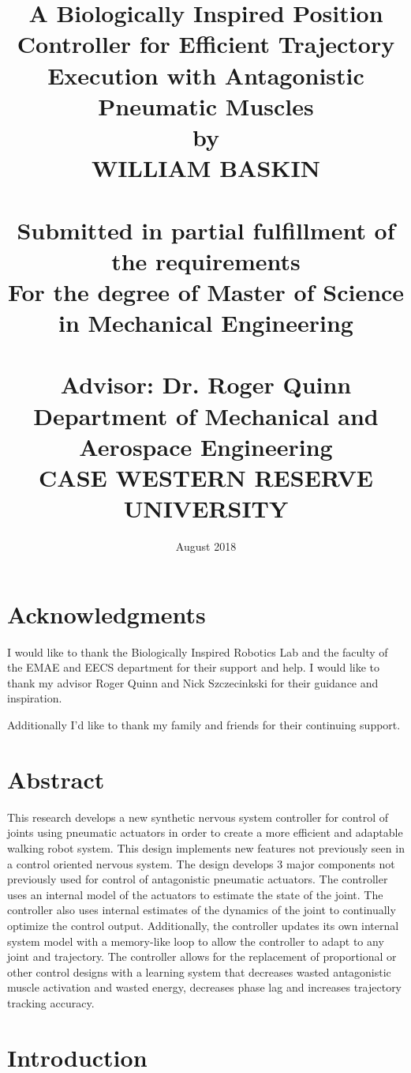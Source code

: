 \documentclass[12pt, letterpaper, oneside, onecolumn]{report} %
\title{
  {A Biologically Inspired Position Controller for Efficient Trajectory Execution with Antagonistic Pneumatic Muscles}\\
  {\large by \\
  WILLIAM BASKIN \\~\\
  Submitted in partial fulfillment of the requirements\\
  For the degree of Master of Science in Mechanical Engineering\\~\\
  Advisor: Dr. Roger Quinn\\
  Department of Mechanical and Aerospace Engineering\\
  CASE WESTERN RESERVE UNIVERSITY}\\
}
\date{August 2018}
\begin{document}
\maketitle


\tableofcontents

\listoffigures

\chapter*{Acknowledgments}
\label{chap:acknowledgements}

I would like to thank the Biologically Inspired Robotics Lab and the faculty of
the EMAE and EECS department for their support and help. I would like to thank my advisor Roger Quinn and Nick Szczecinkski for their guidance and inspiration.

Additionally I'd like to thank my family and friends for their continuing support.

\chapter*{Abstract}
\label{chap:abstract}

This research develops a new synthetic nervous system controller for control of joints using pneumatic actuators in order to create a more efficient and adaptable walking robot system. This design implements new features not previously seen in a control oriented nervous system. The design develops 3 major components not previously used for control of antagonistic pneumatic actuators. The controller uses an internal model of the actuators to estimate the state of the joint. The controller also uses internal estimates of the dynamics of the joint to continually optimize the control output. Additionally, the controller updates its own internal system model with a memory-like loop to allow the controller to adapt to any joint and trajectory. The controller allows for the replacement of proportional or other control designs with a learning system that decreases wasted antagonistic muscle activation and wasted energy, decreases phase lag and increases trajectory tracking accuracy.

\chapter{Introduction}
\label{chap:introduction}


\end{document}
